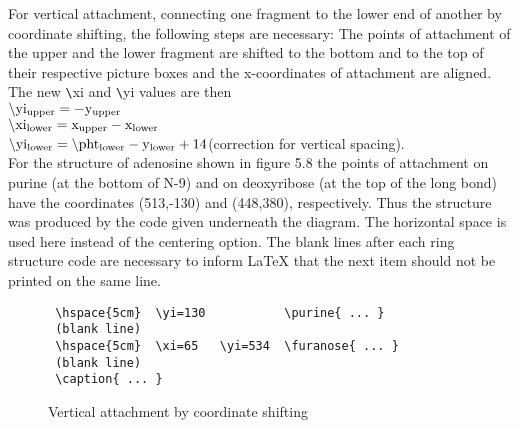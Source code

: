  For vertical attachment, connecting one fragment to the 
 lower end of another by coordinate shifting, the following
 steps are necessary: The points of attachment of the
 upper and the lower fragment are shifted to the bottom
 and to the top of their respective picture boxes and
 the x-coordinates of attachment are aligned. The new
 \verb+\+xi and \verb+\+yi values are then \\
 \indent $\backslash {\rm yi_{upper}=-y_{upper} }$ \\
 \indent $\backslash {\rm xi_{lower}=x_{upper}-x_{lower} }$ \\
 \indent $\backslash {\rm yi_{lower}=\backslash pht_{lower}-
         y_{lower}+14}$(correction for vertical spacing). \\
 \indent For the structure of adenosine shown in figure 5.8
 the points of attachment on purine (at the bottom of
 N-9) and on deoxyribose (at the top of the long bond)
 have the coordinates (513,-130) and (448,380),
 respectively. Thus the structure was produced by the code 
 given underneath the diagram.
 The horizontal space is used here instead of the centering
 option. The blank lines \newpage 
 \noindent after each ring structure code are
 necessary to inform LaTeX that the next item should not
 be printed on the same line.
 
 \begin{figure}
  \hspace{5cm} 

  \hspace{5cm}   

 \begin{minipage}{14cm}
 \begin{verbatim}
 \hspace{5cm}  \yi=130           \purine{ ... }
 (blank line)
 \hspace{5cm}  \xi=65   \yi=534  \furanose{ ... }
 (blank line)
 \caption{ ... }
 \end{verbatim}
 \end{minipage}

  \caption{Vertical attachment by coordinate shifting}
 \end{figure}

